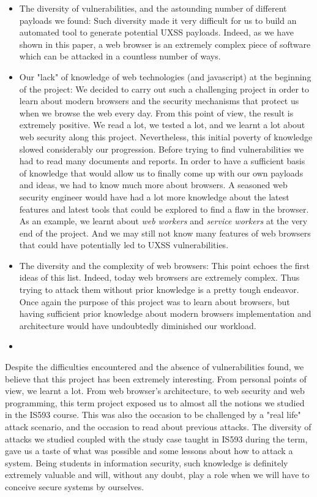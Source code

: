 \documentclass[journal]{IEEEtran}
\begin{document}
\begin{itemize}
\item The diversity of vulnerabilities, and the astounding number of different payloads we found: Such diversity made it very difficult for us to build  an automated tool to generate potential UXSS payloads. Indeed, as we have shown in this paper, a web browser is an extremely complex piece of software which can be attacked in a countless number of ways.
\item Our "lack" of knowledge of web technologies (and javascript) at the beginning of the project: We decided to carry out such a challenging project in order to learn about modern browsers and the security mechanisms that protect us when we browse the web every day. From this point of view, the result is extremely positive. We read a lot, we tested a lot, and we learnt a lot about web security along this project. Nevertheless, this initial poverty of knowledge slowed considerably our progression. Before trying to find vulnerabilities we had to read many documents and reports. In order to have a sufficient basis of knowledge that would allow us to finally come up with our own payloads and ideas, we had to know much more about browsers. A seasoned web security engineer would have had a lot more knowledge about the latest features and latest tools that could be explored to find a flaw in the browser. As an example, we learnt about \emph{web workers} and \emph{service workers} at the very end of the project. And we may still not know many features of web browsers that could have potentially led to UXSS vulnerabilities.
\item The diversity and the complexity of web browsers: This point echoes the first ideas of this list. Indeed, today web browsers are extremely complex. Thus trying to attack them without prior knowledge is a pretty tough endeavor. Once again the purpose of this project was to learn about browsers, but having sufficient prior knowledge about modern browsers implementation and architecture would have undoubtedly diminished our workload.
\item
\end{itemize}

\medskip

Despite the difficulties encountered and the absence of vulnerabilities found, we believe that this project has been extremely interesting. From personal points of view, we learnt a lot. From web browser's architecture, to web security and web programming, this term project exposed us to almost all the notions we studied in the IS593 course. This was also the occasion to be challenged by a "real life" attack scenario, and the occasion to read about previous attacks. The diversity of attacks we studied coupled with the study case taught in IS593 during the term, gave us a taste of what was possible and some lessons about how to attack a system. Being students in information security, such knowledge is definitely extremely valuable and will, without any doubt, play a role when we will have to conceive secure systems by ourselves.
\end{document}
